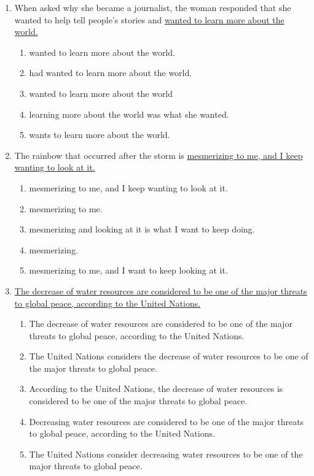 \begin{enumerate}[resume]
\item When asked why she became a journalist, the woman responded that she wanted to help tell people’s stories and \ul{wanted to learn more about the world.}

\begin{enumerate}[label=(\Alph*)]
\item wanted to learn more about the world.
\item had wanted to learn more about the world. 
\item wanted to learn more about the world
\item learning more about the world was what she wanted. 
\item wants to learn more about the world. 
\end{enumerate}

\bigskip
\item The rainbow that occurred after the storm is \ul{mesmerizing to me, and I keep wanting to look at it.}

\begin{enumerate}[label=(\Alph*)]
\item mesmerizing to me, and I keep wanting to look at it.
\item mesmerizing to me. 
\item mesmerizing and looking at it is what I want to keep doing. 
\item mesmerizing. 
\item mesmerizing to me, and I want to keep looking at it.
\end{enumerate}

\bigskip
\item \ul{The decrease of water resources are considered to be one of the major threats to global peace, according to the United Nations.} 

\begin{enumerate}[label=(\Alph*)]
\item The decrease of water resources are considered to be one of the major threats to global peace, according to the United Nations.
\item The United Nations considers the decrease of water resources to be one of the major threats to global peace.
\item According to the United Nations, the decrease of water resources is considered to be one of the major threats to global peace.
\item Decreasing water resources are considered to be one of the major threats to global peace, according to the United Nations.
\item The United Nations consider decreasing water resources to be one of the major threats to global peace.
\end{enumerate}


\end{enumerate}
